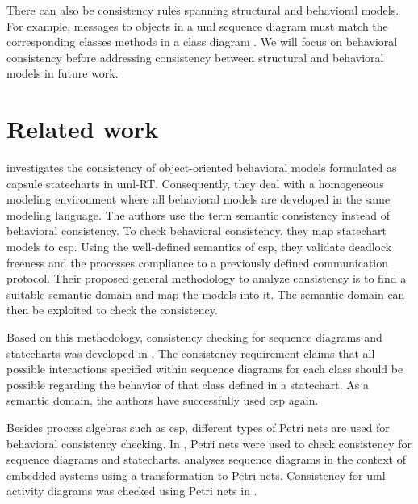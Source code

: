 \documentclass[conference]{IEEEtran}
\begin{document}
There can also be consistency rules spanning structural and behavioral models.
For example, messages to objects in a \gls{uml} sequence diagram must match the corresponding classes methods in a class diagram \cite{egyedFixingInconsistenciesUML2007}.
We will focus on behavioral consistency before addressing consistency between structural and behavioral models in future work. 

\section{Related work}
\cite{engelsMethodologySpecifyingAnalyzing2001} investigates the consistency of object-oriented behavioral models formulated as capsule statecharts in \gls{uml}-RT.
Consequently, they deal with a homogeneous modeling environment where all behavioral models are developed in the same modeling language.
The authors use the term semantic consistency instead of behavioral consistency.
To check behavioral consistency, they map statechart models to \gls{csp}.
Using the well-defined semantics of \gls{csp}, they validate deadlock freeness and the processes compliance to a previously defined communication protocol.
Their proposed general methodology to analyze consistency is to find a suitable semantic domain and map the models into it.
The semantic domain can then be exploited to check the consistency.

Based on this methodology, consistency checking for sequence diagrams and statecharts was developed in \cite{kusterExplicitBehavioralConsistency2003}.
The consistency requirement claims that all possible interactions specified within sequence diagrams for each class should be possible regarding the behavior of that class defined in a statechart.
As a semantic domain, the authors have successfully used \gls{csp} again.

Besides process algebras such as \gls{csp}, different types of Petri nets are used for behavioral consistency checking.
In \cite{yaoConsistencyCheckingUML2006}, Petri nets were used to check consistency for sequence diagrams and statecharts.
\cite{cunhaFormalVerificationUML2011} analyses sequence diagrams in the context of embedded systems using a transformation to Petri nets.
Consistency for \gls{uml} activity diagrams was checked using Petri nets in \cite{thierry-miegUMLBehavioralConsistency2008}.
\end{document}
